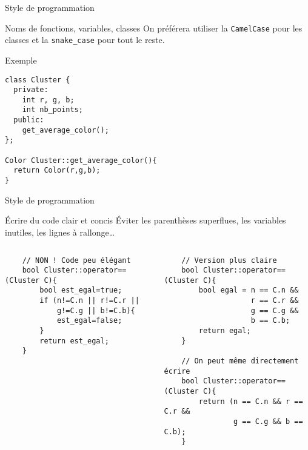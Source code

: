 \begin{frame}[fragile]{Style de programmation}

\begin{block}{Noms de fonctions, variables, classes}
On préférera utiliser la \texttt{CamelCase} pour les classes et la \texttt{snake_case} pour tout le reste.
\end{block}

\begin{exampleblock}{Exemple}
\begin{verbatim}
class Cluster {
  private:
    int r, g, b;
    int nb_points;
  public:
    get_average_color();
};

Color Cluster::get_average_color(){
  return Color(r,g,b);
}
\end{verbatim}
\end{exampleblock}
\end{frame}

\begin{frame}[fragile]{Style de programmation}
\begin{block}{Écrire du code clair et concis}
Éviter les parenthèses superflues, les variables inutiles, les lignes à rallonge\dots
\end{block}

\begin{columns}
    \begin{column}{0.52\textwidth}
    \begin{verbatim}
    // NON ! Code peu élégant
    bool Cluster::operator==(Cluster C){
        bool est_egal=true;
        if (n!=C.n || r!=C.r ||
            g!=C.g || b!=C.b){
            est_egal=false;
        }
        return est_egal;
    }
    \end{verbatim}
    \end{column}
    \begin{column}{0.52\textwidth}
    \begin{verbatim}
    // Version plus claire
    bool Cluster::operator==(Cluster C){
        bool egal = n == C.n &&
                    r == C.r &&
                    g == C.g &&
                    b == C.b;
        return egal;
    }

    // On peut même directement écrire 
    bool Cluster::operator==(Cluster C){
        return (n == C.n && r == C.r &&
                g == C.g && b == C.b);
    }
    \end{verbatim}
    \end{column}
\end{columns}
\end{frame}


